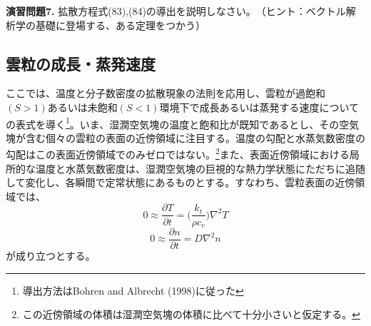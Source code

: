 \documentclass{jsarticle}
\begin{document}
\begin{itembox}[l]{\bf{演習問題7.}}
拡散方程式(83),(84)の導出を説明しなさい。　（ヒント：ベクトル解析学の基礎に登場する、ある定理をつかう）
\end{itembox}


\subsection{雲粒の成長・蒸発速度}
ここでは、温度と分子数密度の拡散現象の法則を応用し、雲粒が過飽和$(S>1)$あるいは未飽和$(S<1)$環境下で成長あるいは蒸発する速度についての表式を導く\footnote{導出方法はBohren and Albrecht (1998)に従った}。いま、湿潤空気塊の温度と飽和比が既知であるとし、その空気塊が含む個々の雲粒の表面の近傍領域に注目する。温度の勾配と水蒸気数密度の勾配はこの表面近傍領域でのみゼロではない。\footnote{この近傍領域の体積は湿潤空気塊の体積に比べて十分小さいと仮定する。}また、表面近傍領域における局所的な温度と水蒸気数密度は、湿潤空気塊の巨視的な熱力学状態にただちに追随して変化し、各瞬間で定常状態にあるものとする。すなわち、雲粒表面の近傍領域では、
\begin{equation}
0\approx \frac{\partial T}{\partial t}= {\bigg (}\frac{k_{t}}{\rho c_{v}}{\bigg )}\nabla^{2}T
\end{equation}
\begin{equation}
0\approx \frac{\partial n}{\partial t}= D\nabla^{2}n
\end{equation}
が成り立つとする。
\end{document}
